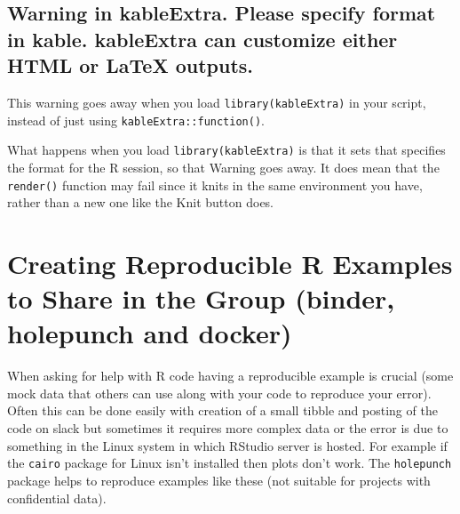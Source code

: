 \documentclass[
]{book}
\begin{document}
\begin{table}[!h]

\caption{\label{tab:unnamed-chunk-3}}
\centering
{}
\end{table}

\hypertarget{warning-in-kableextra.-please-specify-format-in-kable.-kableextra-can-customize-either-html-or-latex-outputs.}{%
\subsection{Warning in kableExtra. Please specify format in kable. kableExtra can customize either HTML or LaTeX outputs.}\label{warning-in-kableextra.-please-specify-format-in-kable.-kableextra-can-customize-either-html-or-latex-outputs.}}

This warning goes away when you load \texttt{library(kableExtra)} in your script, instead of just using \texttt{kableExtra::function()}.

What happens when you load \texttt{library(kableExtra)} is that it sets that specifies the format for the R session, so that Warning goes away. It does mean that the \texttt{render()} function may fail since it knits in the same environment you have, rather than a new one like the Knit button does.

\hypertarget{creating-reproducible-r-examples-to-share-in-the-group-binder-holepunch-and-docker}{%
\section{Creating Reproducible R Examples to Share in the Group (binder, holepunch and docker)}\label{creating-reproducible-r-examples-to-share-in-the-group-binder-holepunch-and-docker}}

When asking for help with R code having a reproducible example is crucial (some mock data that others can use along with your code to reproduce your error). Often this can be done easily with creation of a small tibble and posting of the code on slack but sometimes it requires more complex data or the error is due to something in the Linux system in which RStudio server is hosted. For example if the \texttt{cairo} package for Linux isn't installed then plots don't work. The \texttt{holepunch} package helps to reproduce examples like these (not suitable for projects with confidential data).
\end{document}

